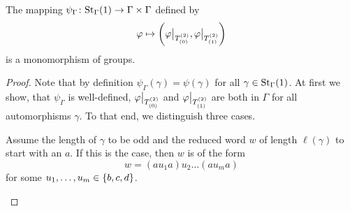 \begin{lem}\label{thm:psi Gamma}
The mapping $\psi_\Gamma\colon\St[\Gamma]{1}\to\Gamma\times\Gamma$ defined by
\begin{equation*}
\varphi\mapsto\left(\varphi\big\vert_{\ST{(0)}},\varphi\big\vert_{\ST{(1)}}\right)
\end{equation*}
is a monomorphism of groups.
\end{lem}
\begin{proof}
Note that by definition $\psi_\Gamma(\gamma)=\psi(\gamma)$ for all $\gamma\in\St[\Gamma]{1}$. At first we show, that $\psi_\Gamma$ is well-defined, \ie{} $\varphi\big\vert_{\ST{(0)}}$ and $\varphi\big\vert_{\ST{(1)}}$ are both in $\Gamma$ for all automorphisms $\gamma$. To that end, we distinguish three cases.
\begin{clist}
\item Assume the length of $\gamma$ to be odd and the reduced word $w$ of length $\ell(\gamma)$ to start with an $a$. If this is the case, then $w$ is of the form
\begin{equation*}
w=(au_1a)u_2\ldots (au_ma)
\end{equation*}
for some $\seq[m]{u}\in\lbrace b,c,d\rbrace$.


\end{clist}
\end{proof}
